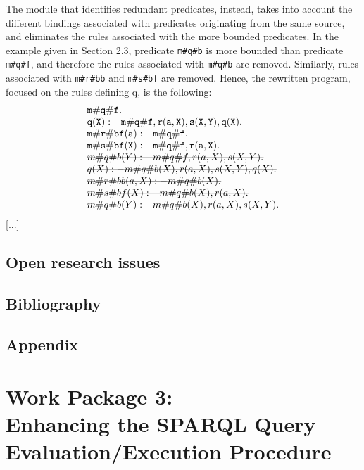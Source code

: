 \documentclass[oneside]{book}
\newcommand{\stkout}[1]{\ifmmode\text{\sout{\ensuremath{#1}}}\else\sout{#1}\fi}
\begin{document}
The module that identifies redundant predicates, instead, takes into account the different bindings associated with predicates originating from the same source, and eliminates the rules associated with the more bounded predicates. In the example given in Section 2.3, predicate {\tt m\#q\#b} is more bounded than predicate {\tt m\#q\#f}, and therefore the rules associated with {\tt m\#q\#b} are removed. Similarly, rules associated with {\tt m\#r\#bb} and {\tt m\#s\#bf} are removed. Hence, the rewritten program, focused on the rules defining q, is the following:
\[
\begin{array}{l}
	{\tt m\#q\#f.}\\
	{\tt q(X) :- m\#q\#f, r(a,X), s(X,Y), q(X).}\\
	{\tt m\#r\#bf(a) :- m\#q\#f.}\\
	{\tt m\#s\#bf(X) :- m\#q\#f, r(a,X).}\\
	\mathtt{\stkout{m\#q\#b(Y) :- m\#q\#f, r(a,X), s(X,Y).}}\\
	\mathtt{\stkout{q(X) :- m\#q\#b(X), r(a,X), s(X,Y), q(X).}}\\
	\mathtt{\stkout{m\#r\#bb(a,X) :- m\#q\#b(X).}}\\
	\mathtt{\stkout{m\#s\#bf(X) :- m\#q\#b(X), r(a,X).}}\\
	\mathtt{\stkout{m\#q\#b(Y) :- m\#q\#b(X), r(a,X), s(X,Y).}}\\
\end{array}
\]
[...]



\chapter{Open research issues}
\chapter{Bibliography}
\chapter{Appendix}


\setcounter{chapter}{0}

\part*{Work Package 3:\\Enhancing the SPARQL Query Evaluation/Execution Procedure}
\end{document}
